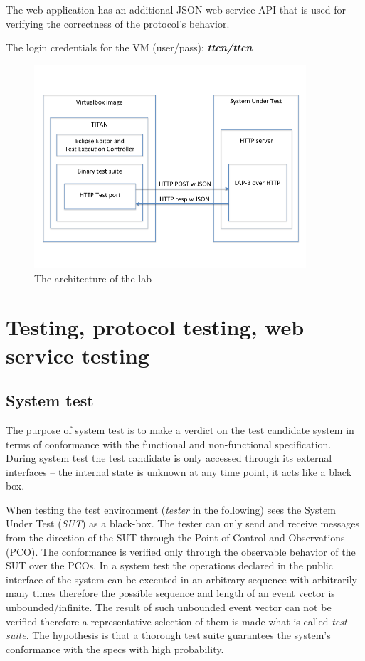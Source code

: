 \documentclass[a4paper]{article}
\begin{document}
The web application has an additional JSON web service API that is used for verifying the correctness of the protocol's behavior.

The login credentials for the VM (user/pass): \textbf{\emph{ttcn/ttcn}}

\begin{figure}[!htb]
    \centering
    \includegraphics[width=0.9\textwidth]{figures/lab-arch.png}
    \caption{The architecture of the lab}
    \label{fig:lab-arch}
\end{figure}

\section{Testing, protocol testing, web service testing}

\subsection{System test}

The purpose of system test is to make a verdict on the test candidate system in terms of conformance with the functional and non-functional specification. During system test the test candidate is only accessed through its external interfaces -- the internal state is unknown at any time point, it acts like a black box.

When testing the test environment (\emph{tester} in the following) sees the System Under Test (\emph{SUT}) as a black-box. The tester can only send and receive messages from the direction of the SUT through the Point of Control and Observations (PCO). The conformance is verified only through the observable behavior of the SUT over the PCOs.
In a system test the operations declared in the public interface of the system can be executed in an arbitrary sequence with arbitrarily many times therefore the possible sequence and length of an event vector is unbounded/infinite. The result of such unbounded event vector can not be verified therefore a representative selection of them is made what is called \emph{test suite}. The hypothesis is that a thorough test suite guarantees the system's conformance with the specs with high probability.
\end{document}
